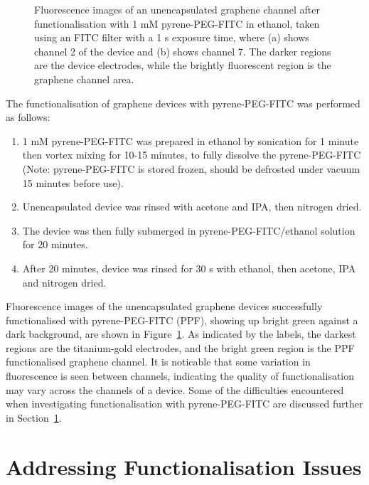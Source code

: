 \documentclass[
  a4paper,
]{scrbook}
\begin{document}
\begin{figure}
\begin{minipage}[t]{0.47\linewidth}
{{}

}

\subcaption{\label{fig-FITC-EtOH-ch7}}
\end{minipage}%

\caption{\label{fig-FITC-EtOH}Fluorescence images of an unencapsulated
graphene channel after functionalisation with 1 mM pyrene-PEG-FITC in
ethanol, taken using an FITC filter with a 1 s exposure time, where (a)
shows channel 2 of the device and (b) shows channel 7. The darker
regions are the device electrodes, while the brightly fluorescent region
is the graphene channel area.}

\end{figure}

The functionalisation of graphene devices with pyrene-PEG-FITC was
performed as follows:

\begin{enumerate}
\def\labelenumi{\arabic{enumi}.}
\item
  1 mM pyrene-PEG-FITC was prepared in ethanol by sonication for 1
  minute then vortex mixing for 10-15 minutes, to fully dissolve the
  pyrene-PEG-FITC (Note: pyrene-PEG-FITC is stored frozen, should be
  defrosted under vacuum 15 minutes before use).
\item
  Unencapsulated device was rinsed with acetone and IPA, then nitrogen
  dried.
\item
  The device was then fully submerged in pyrene-PEG-FITC/ethanol
  solution for 20 minutes.
\item
  After 20 minutes, device was rinsed for 30 s with ethanol, then
  acetone, IPA and nitrogen dried.
\end{enumerate}

Fluorescence images of the unencapsulated graphene devices successfully
functionalised with pyrene-PEG-FITC (PPF), showing up bright green
against a dark background, are shown in Figure~\ref{fig-FITC-EtOH}. As
indicated by the labels, the darkest regions are the titanium-gold
electrodes, and the bright green region is the PPF functionalised
graphene channel. It is noticable that some variation in fluorescence is
seen between channels, indicating the quality of functionalisation may
vary across the channels of a device. Some of the difficulties
encountered when investigating functionalisation with pyrene-PEG-FITC
are discussed further in Section~\ref{sec-impediments}.

\hypertarget{sec-impediments}{%
\section{Addressing Functionalisation Issues}\label{sec-impediments}}
\end{document}
